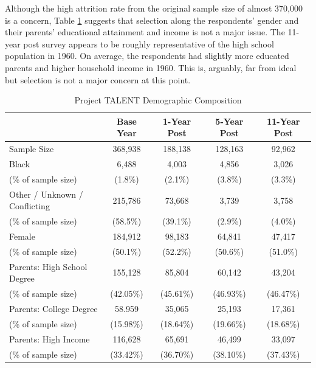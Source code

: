 \documentclass[onehalfspacing,11pt]{article}
\begin{document}
	Although the high attrition rate from the original sample size of almost 370,000 is a concern, Table \ref{tab:samplebywave} suggests that selection along the respondents' gender and their parents' educational attainment and income is not a major issue. The 11-year post survey appears to be roughly representative of the high school population in 1960. On average, the respondents had slightly more educated parents and higher household income in 1960. This is, arguably, far from ideal but selection is not a major concern at this point.
	\begin{table}[h!]
		\centering 
		\begin{tabular}{lcccc}
			\toprule
			& Base Year & 1-Year Post & 5-Year Post & 11-Year Post\\
			\midrule
			Sample Size & 368,938 & 188,138 & 128,163 & 92,962 \\
			\midrule
			Black   & 6,488 & 4,003 & 4,856 & 3,026 \\
			
			\quad (\% of sample size) & (1.8\%) & (2.1\%) & (3.8\%) & (3.3\%) \\
			\midrule
			Other / Unknown / Conflicting & 215,786 & 73,668 & 3,739 & 3,758 \\
			\quad (\% of sample size) & (58.5\%) & (39.1\%) & (2.9\%) & (4.0\%) \\
			\midrule
			Female   & 184,912 & 98,183 & 64,841 & 47,417 \\
			\quad (\% of sample size) & (50.1\%) & (52.2\%) & (50.6\%) & (51.0\%) \\
			\midrule
			Parents: High School Degree & 155,128 & 85,804 & 60,142 & 43,204 \\
			\quad (\% of sample size) & (42.05\%) & (45.61\%) & (46.93\%) & (46.47\%)\\
			\midrule
			Parents: College Degree & 58.959 & 35,065 & 25,193 & 17,361 \\
			\quad (\% of sample size) & (15.98\%) & (18.64\%) & (19.66\%) & (18.68\%)\\
			\midrule
			Parents: High Income & 116,628 & 65,691 & 46,499 & 33,097 \\
			\quad (\% of sample size) & (33.42\%) & (36.70\%) & (38.10\%) & (37.43\%) \\
			\midrule
			\bottomrule
		\end{tabular}
		
		\caption{Project TALENT Demographic Composition}
		\label{tab:samplebywave}
	\end{table}
	
\end{document}
